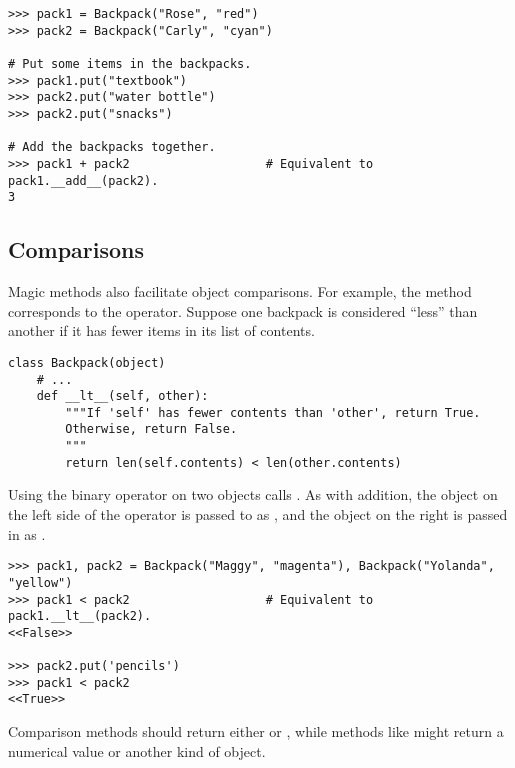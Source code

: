 \begin{lstlisting}
>>> pack1 = Backpack("Rose", "red")
>>> pack2 = Backpack("Carly", "cyan")

# Put some items in the backpacks.
>>> pack1.put("textbook")
>>> pack2.put("water bottle")
>>> pack2.put("snacks")

# Add the backpacks together.
>>> pack1 + pack2                   # Equivalent to pack1.__add__(pack2).
3
\end{lstlisting}


\subsection*{Comparisons} %

Magic methods also facilitate object comparisons.
For example, the  method corresponds to the \li{<} operator.
Suppose one backpack is considered ``less'' than another if it has fewer items in its list of contents.

\begin{lstlisting}
class Backpack(object)
    # ...
    def __lt__(self, other):
        """If 'self' has fewer contents than 'other', return True.
        Otherwise, return False.
        """
        return len(self.contents) < len(other.contents)
\end{lstlisting}

Using the \li{<} binary operator on two  objects calls .
As with addition, the object on the left side of the \li{<} operator is passed to  as , and the object on the right is passed in as .

\begin{lstlisting}
>>> pack1, pack2 = Backpack("Maggy", "magenta"), Backpack("Yolanda", "yellow")
>>> pack1 < pack2                   # Equivalent to pack1.__lt__(pack2).
<<False>>

>>> pack2.put('pencils')
>>> pack1 < pack2
<<True>>
\end{lstlisting}

Comparison methods should return either  or , while methods like  might return a numerical value or another kind of object.

